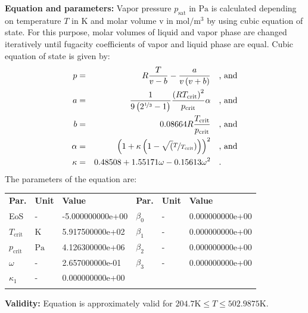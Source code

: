 \textbf{Equation and parameters:}
\newline
%
Vapor pressure $p_\mathrm{sat}$ in $\si{\pascal}$ is calculated depending on temperature $T$ in $\si{\kelvin}$ and molar volume v in $\si{\mole\per\cubic\meter}$ by using cubic equation of state. For this purpose, molar volumes of liquid and vapor phase are changed iteratively until fugacity coefficients of vapor and liquid phase are equal. Cubic equation of state is given by:
\begin{equation*}
\begin{split}
p &=& R \frac{T}{v - b} - \frac{a}{v \left(v + b\right)} & \quad\text{, and} \\
a &=& \frac{1}{9 \left(2^{\nicefrac{1}{3}} - 1\right)} \frac{\left(R T_\mathrm{crit} \right)^2}{p_\mathrm{crit}} \alpha & \quad\text{, and} \\
b &=& 0.08664 R \frac{T_\mathrm{crit}}{p_\mathrm{crit}} & \quad\text{, and} \\
\alpha &=& \left(1 + \kappa \left(1 - \sqrt(\nicefrac{T}{T_\mathrm{crit}}) \right) \right)^2 & \quad\text{, and} \\
\kappa &=& 0.48508 + 1.55171 \omega - 0.15613 \omega^2 & \quad\text{.}
\end{split}
\end{equation*}
%
The parameters of the equation are:
%
\begin{longtable}[l]{lll|lll}
\toprule
\addlinespace
\textbf{Par.} & \textbf{Unit} & \textbf{Value} &	\textbf{Par.} & \textbf{Unit} & \textbf{Value} \\
\addlinespace
\midrule
\endhead

\bottomrule
\endfoot
\bottomrule
\endlastfoot
\addlinespace

EoS & - & -5.000000000e+00 & $\beta_0$ & - & 0.000000000e+00 \\
$T_\mathrm{crit}$ & $\si{\kelvin}$ & 5.917500000e+02 & $\beta_1$ & - & 0.000000000e+00 \\
$p_\mathrm{crit}$ & $\si{\pascal}$ & 4.126300000e+06 & $\beta_2$ & - & 0.000000000e+00 \\
$\omega$ & - & 2.657000000e-01 & $\beta_3$ & - & 0.000000000e+00 \\
$\kappa_1$ & - & 0.000000000e+00 & & & \\

\addlinespace\end{longtable}

\textbf{Validity:}
\newline
Equation is approximately valid for $204.7 \si{\kelvin} \leq T \leq 502.9875 \si{\kelvin}$.
\newline

